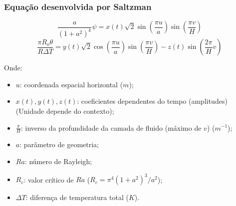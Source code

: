 \begin{frame}[t]
    \frametitle{\small Equação desenvolvida por Saltzman}
    
    {\small
    \begin{equation}
        \frac{a}{(1 + a^2)^k} \psi = x(t)\sqrt{2} \sin \left(\frac{\pi u}{a}\right) \sin \left(\frac{\pi v}{H}\right)
    \end{equation}
    \begin{equation}
        \frac{\pi R_o \theta}{R \Delta T} = y(t)\sqrt{2} \cos \left(\frac{\pi u}{a}\right) \sin \left(\frac{\pi v}{H}\right) - z(t) \sin \left(\frac{2\pi}{H}v\right)
    \end{equation}
    }

    {\scriptsize
    Onde:
    \begin{itemize}
        \item $u$: coordenada espacial horizontal ($m$);
        \item $x(t), y(t), z(t)$: coeficientes dependentes do tempo (amplitudes) (Unidade depende do contexto);
        \item $\frac{\pi}{H}$: inverso da profundidade da camada de fluido (máximo de $v$) ($m^{-1}$);
        \item $a$: parâmetro de geometria;
        \item $Ra$: número de Rayleigh;
        \item $R_c$: valor crítico de $Ra$ ($R_c = \pi^4(1 + a^2)^3/a^2$);
        \item $\Delta T$: diferença de temperatura total ($K$).
    \end{itemize}
    }
\end{frame}

